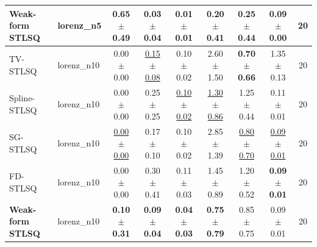\begin{tabular}{llccccccc}
\textbf{Weak-form STLSQ} & lorenz\_n5 & \textbf{0.65 $\pm$ 0.49} & \textbf{0.03 $\pm$ 0.04} & \textbf{0.01 $\pm$ 0.01} & \textbf{0.20 $\pm$ 0.41} & 0.25 $\pm$ 0.44 & 0.09 $\pm$ 0.00 & 20 \\
\midrule
TV-STLSQ & lorenz\_n10 & 0.00 $\pm$ 0.00 & \underline{0.15 $\pm$ 0.08} & 0.10 $\pm$ 0.02 & 2.60 $\pm$ 1.50 & \textbf{0.70 $\pm$ 0.66} & 1.35 $\pm$ 0.13 & 20 \\
Spline-STLSQ & lorenz\_n10 & 0.00 $\pm$ 0.00 & 0.25 $\pm$ 0.25 & \underline{0.10 $\pm$ 0.02} & \underline{1.30 $\pm$ 0.86} & 1.25 $\pm$ 0.44 & 0.11 $\pm$ 0.01 & 20 \\
SG-STLSQ & lorenz\_n10 & \underline{0.00 $\pm$ 0.00} & 0.17 $\pm$ 0.10 & 0.10 $\pm$ 0.02 & 2.85 $\pm$ 1.39 & \underline{0.80 $\pm$ 0.70} & \underline{0.09 $\pm$ 0.01} & 20 \\
FD-STLSQ & lorenz\_n10 & 0.00 $\pm$ 0.00 & 0.30 $\pm$ 0.41 & 0.11 $\pm$ 0.03 & 1.45 $\pm$ 0.89 & 1.20 $\pm$ 0.52 & \textbf{0.09 $\pm$ 0.01} & 20 \\
\textbf{Weak-form STLSQ} & lorenz\_n10 & \textbf{0.10 $\pm$ 0.31} & \textbf{0.09 $\pm$ 0.04} & \textbf{0.04 $\pm$ 0.03} & \textbf{0.75 $\pm$ 0.79} & 0.85 $\pm$ 0.75 & 0.09 $\pm$ 0.01 & 20 \\
\bottomrule
\end{tabular}
